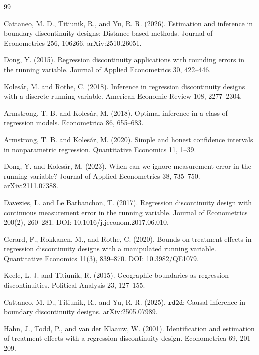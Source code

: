 \documentclass{article}
\begin{document}
\begin{thebibliography}{99}

   Cattaneo, M. D., Titiunik, R., and Yu, R. R. (2026). Estimation and inference in boundary discontinuity designs: Distance-based methods. Journal of Econometrics 256, 106266. arXiv:2510.26051.

   Dong, Y. (2015). Regression discontinuity applications with rounding errors in the running variable. Journal of Applied Econometrics 30, 422--446.

   Koles\'ar, M. and Rothe, C. (2018). Inference in regression discontinuity designs with a discrete running variable. American Economic Review 108, 2277--2304.

   Armstrong, T. B. and Koles\'ar, M. (2018). Optimal inference in a class of regression models. Econometrica 86, 655--683.

   Armstrong, T. B. and Koles\'ar, M. (2020). Simple and honest confidence intervals in nonparametric regression. Quantitative Economics 11, 1--39.

   Dong, Y. and Koles\'ar, M. (2023). When can we ignore measurement error in the running variable? Journal of Applied Econometrics 38, 735--750. arXiv:2111.07388.

   Davezies, L. and Le Barbanchon, T. (2017). Regression discontinuity design with continuous measurement error in the running variable. Journal of Econometrics 200(2), 260--281. DOI: 10.1016/j.jeconom.2017.06.010.

   Gerard, F., Rokkanen, M., and Rothe, C. (2020). Bounds on treatment effects in regression discontinuity designs with a manipulated running variable. Quantitative Economics 11(3), 839--870. DOI: 10.3982/QE1079.

   Keele, L. J. and Titiunik, R. (2015). Geographic boundaries as regression discontinuities. Political Analysis 23, 127--155.

   Cattaneo, M. D., Titiunik, R., and Yu, R. R. (2025). \(\texttt{rd2d}\): Causal inference in boundary discontinuity designs. arXiv:2505.07989.

   Hahn, J., Todd, P., and van der Klaauw, W. (2001). Identification and estimation of treatment effects with a regression-discontinuity design. Econometrica 69, 201--209.


\end{thebibliography}
\end{document}
